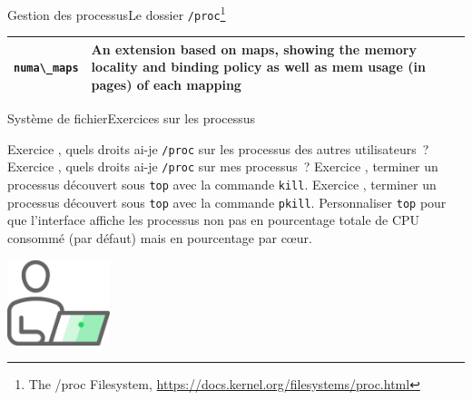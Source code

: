 \documentclass{beamer}
\begin{document}
\begin{frame}{Gestion des processus}{Le dossier \lstinline{/proc}\footnote{The /proc Filesystem, \url{https://docs.kernel.org/filesystems/proc.html}}}
\begin{footnotesize}
\begin{tiny}
\begin{table}[h!]
\begin{tabular}{|p{2cm}|p{8cm}|}
                        \hline
                        \lstinline{numa\_maps}    & An extension based on maps, showing the memory locality and binding policy as well as mem usage (in pages) of each mapping      \\
                        \hline
                    \end{tabular}
                \end{table}
            \end{tiny}
        \end{footnotesize}
    \end{frame}

    \begin{frame}{Système de fichier}{Exercices sur les processus}
        \begin{small}
            Exercice \execcounterdispinc{}, quels droits ai-je \lstinline{/proc} sur les processus des autres utilisateurs~?
            \bigbreak
            Exercice \execcounterdispinc{}, quels droits ai-je \lstinline{/proc} sur mes processus~?
            \bigbreak
            Exercice \execcounterdispinc{}, terminer un processus découvert sous \lstinline{top} avec la commande \lstinline{kill}.
            \bigbreak
            Exercice \execcounterdispinc{}, terminer un processus découvert sous \lstinline{top} avec la commande \lstinline{pkill}.
            \bigbreak
            Personnaliser \lstinline{top} pour que l'interface affiche les processus non pas en pourcentage totale de CPU consommé (par défaut) mais en pourcentage par cœur.
        \end{small}
        \begin{center}
            \includegraphics[width=3cm]{image/guy-in-front-of-desktop}
        \end{center}
    \end{frame}
\end{document}
